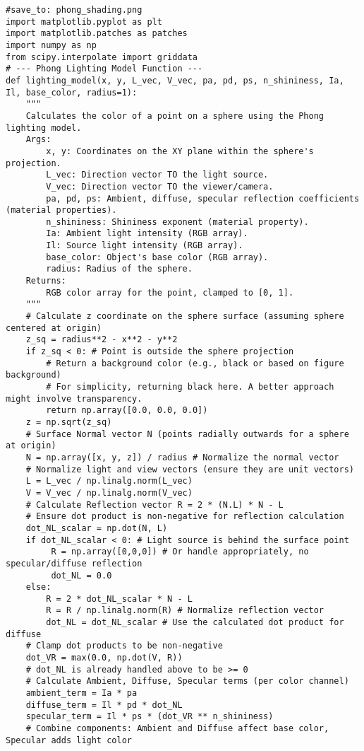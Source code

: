 \begin{verbatim}
#save_to: phong_shading.png
import matplotlib.pyplot as plt
import matplotlib.patches as patches
import numpy as np
from scipy.interpolate import griddata
# --- Phong Lighting Model Function ---
def lighting_model(x, y, L_vec, V_vec, pa, pd, ps, n_shininess, Ia, Il, base_color, radius=1):
    """
    Calculates the color of a point on a sphere using the Phong lighting model.
    Args:
        x, y: Coordinates on the XY plane within the sphere's projection.
        L_vec: Direction vector TO the light source.
        V_vec: Direction vector TO the viewer/camera.
        pa, pd, ps: Ambient, diffuse, specular reflection coefficients (material properties).
        n_shininess: Shininess exponent (material property).
        Ia: Ambient light intensity (RGB array).
        Il: Source light intensity (RGB array).
        base_color: Object's base color (RGB array).
        radius: Radius of the sphere.
    Returns:
        RGB color array for the point, clamped to [0, 1].
    """
    # Calculate z coordinate on the sphere surface (assuming sphere centered at origin)
    z_sq = radius**2 - x**2 - y**2
    if z_sq < 0: # Point is outside the sphere projection
        # Return a background color (e.g., black or based on figure background)
        # For simplicity, returning black here. A better approach might involve transparency.
        return np.array([0.0, 0.0, 0.0])
    z = np.sqrt(z_sq)
    # Surface Normal vector N (points radially outwards for a sphere at origin)
    N = np.array([x, y, z]) / radius # Normalize the normal vector
    # Normalize light and view vectors (ensure they are unit vectors)
    L = L_vec / np.linalg.norm(L_vec)
    V = V_vec / np.linalg.norm(V_vec)
    # Calculate Reflection vector R = 2 * (N.L) * N - L
    # Ensure dot product is non-negative for reflection calculation
    dot_NL_scalar = np.dot(N, L)
    if dot_NL_scalar < 0: # Light source is behind the surface point
         R = np.array([0,0,0]) # Or handle appropriately, no specular/diffuse reflection
         dot_NL = 0.0
    else:
        R = 2 * dot_NL_scalar * N - L
        R = R / np.linalg.norm(R) # Normalize reflection vector
        dot_NL = dot_NL_scalar # Use the calculated dot product for diffuse
    # Clamp dot products to be non-negative
    dot_VR = max(0.0, np.dot(V, R))
    # dot_NL is already handled above to be >= 0
    # Calculate Ambient, Diffuse, Specular terms (per color channel)
    ambient_term = Ia * pa
    diffuse_term = Il * pd * dot_NL
    specular_term = Il * ps * (dot_VR ** n_shininess)
    # Combine components: Ambient and Diffuse affect base color, Specular adds light color

\end{verbatim}
